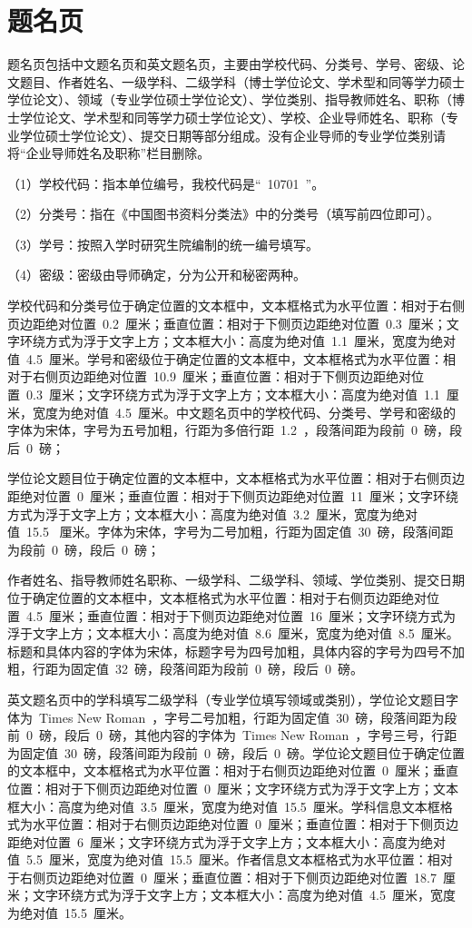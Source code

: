 \section{题名页}

题名页包括中文题名页和英文题名页，主要由学校代码、分类号、学号、密级、论文题目、作者姓名、一级学科、二级学科（博士学位论文、学术型和同等学力硕士学位论文）、领域（专业学位硕士学位论文）、学位类别、指导教师姓名、职称（博士学位论文、学术型和同等学力硕士学位论文）、学校、企业导师姓名、职称（专业学位硕士学位论文）、提交日期等部分组成。没有企业导师的专业学位类别请将“企业导师姓名及职称”栏目删除。

（1）学校代码：指本单位编号，我校代码是“~10701~”。

（2）分类号：指在《中国图书资料分类法》中的分类号（填写前四位即可）。

（3）学号：按照入学时研究生院编制的统一编号填写。

（4）密级：密级由导师确定，分为公开和秘密两种。

学校代码和分类号位于确定位置的文本框中，文本框格式为水平位置：相对于右侧页边距绝对位置~0.2~厘米；垂直位置：相对于下侧页边距绝对位置~0.3~厘米；文字环绕方式为浮于文字上方；文本框大小：高度为绝对值~1.1~厘米，宽度为绝对值~4.5~厘米。学号和密级位于确定位置的文本框中，文本框格式为水平位置：相对于右侧页边距绝对位置~10.9~厘米；垂直位置：相对于下侧页边距绝对位置~0.3~厘米；文字环绕方式为浮于文字上方；文本框大小：高度为绝对值~1.1~厘米，宽度为绝对值~4.5~厘米。中文题名页中的学校代码、分类号、学号和密级的字体为宋体，字号为五号加粗，行距为多倍行距~1.2~，段落间距为段前~0~磅，段后~0~磅；

学位论文题目位于确定位置的文本框中，文本框格式为水平位置：相对于右侧页边距绝对位置~0~厘米；垂直位置：相对于下侧页边距绝对位置~11~厘米；文字环绕方式为浮于文字上方；文本框大小：高度为绝对值~3.2~厘米，宽度为绝对值~15.5~ 厘米。字体为宋体，字号为二号加粗，行距为固定值~30~磅，段落间距为段前~0~磅，段后~0~磅；

作者姓名、指导教师姓名职称、一级学科、二级学科、领域、学位类别、提交日期位于确定位置的文本框中，文本框格式为水平位置：相对于右侧页边距绝对位置~4.5~厘米；垂直位置：相对于下侧页边距绝对位置~16~厘米；文字环绕方式为浮于文字上方；文本框大小：高度为绝对值~8.6~厘米，宽度为绝对值~8.5~厘米。标题和具体内容的字体为宋体，标题字号为四号加粗，具体内容的字号为四号不加粗，行距为固定值~32~磅，段落间距为段前~0~磅，段后~0~磅。

英文题名页中的学科填写二级学科（专业学位填写领域或类别），学位论文题目字体为~Times New Roman~，字号二号加粗，行距为固定值~30~磅，段落间距为段前~0~磅，段后~0~磅，其他内容的字体为~Times New Roman~，字号三号，行距为固定值~30~磅，段落间距为段前~0~磅，段后~0~磅。学位论文题目位于确定位置的文本框中，文本框格式为水平位置：相对于右侧页边距绝对位置~0~厘米；垂直位置：相对于下侧页边距绝对位置~0~厘米；文字环绕方式为浮于文字上方；文本框大小：高度为绝对值~3.5~厘米，宽度为绝对值~15.5~厘米。学科信息文本框格式为水平位置：相对于右侧页边距绝对位置~0~厘米；垂直位置：相对于下侧页边距绝对位置~6~厘米；文字环绕方式为浮于文字上方；文本框大小：高度为绝对值~5.5~厘米，宽度为绝对值~15.5~厘米。作者信息文本框格式为水平位置：相对于右侧页边距绝对位置~0~厘米；垂直位置：相对于下侧页边距绝对位置~18.7~厘米；文字环绕方式为浮于文字上方；文本框大小：高度为绝对值~4.5~厘米，宽度为绝对值~15.5~厘米。

